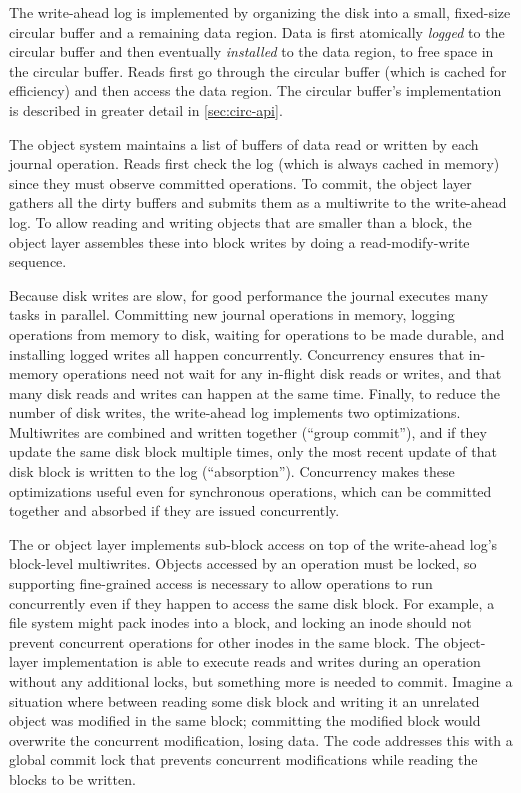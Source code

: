 The write-ahead log is implemented by organizing the disk into a small,
fixed-size circular buffer and a remaining data region. Data is first atomically
\emph{logged} to the circular buffer and then eventually \emph{installed}
to the data region, to free space in the circular buffer. Reads first go through
the circular buffer (which is cached for efficiency) and then access the data
region. The circular buffer's implementation is described in greater detail in
\cref{sec:circ-api}.

The object system maintains a list of buffers of data read or written by each journal operation.
Reads first check the log (which is always cached in memory) since
they must observe committed operations. To commit, the object
layer gathers all the dirty buffers and submits them as a multiwrite to the
write-ahead log. To allow reading and writing objects that are smaller than a
block, the object layer assembles these into block writes by doing a
read-modify-write sequence.

Because disk writes are slow, for good performance the journal executes many
tasks in parallel. Committing new journal operations in memory, logging operations
from memory to disk, waiting for operations to be made durable, and
installing logged writes all happen concurrently.  Concurrency ensures that
in-memory operations
need not wait for any in-flight disk reads or writes, and that many
disk reads and writes can happen at the same time.  Finally, to reduce the
number of disk writes, the write-ahead log implements two optimizations.
Multiwrites are combined and written
together (``group commit''), and if they update the same disk
block multiple times, only the most recent update of that disk block is
written to the log (``absorption''). Concurrency makes these optimizations
useful even for synchronous operations, which can be committed together and
absorbed if they are issued concurrently.

The  or object layer implements sub-block access on top of the write-ahead
log's block-level multiwrites. Objects accessed by an operation must be locked,
so supporting fine-grained access is necessary to allow operations to run
concurrently even if they happen to access the same disk block. For example, a
file system might pack inodes into a block, and locking an inode should not
prevent concurrent operations for other inodes in the same block. The
object-layer implementation is able to execute reads and writes during an
operation without any additional locks, but something more is needed to commit.
Imagine a situation where between reading some disk block and writing it an
unrelated object was modified in the same block; committing the modified block
would overwrite the concurrent modification, losing data. The code addresses
this with a global commit lock that prevents concurrent modifications while
reading the blocks to be written.


